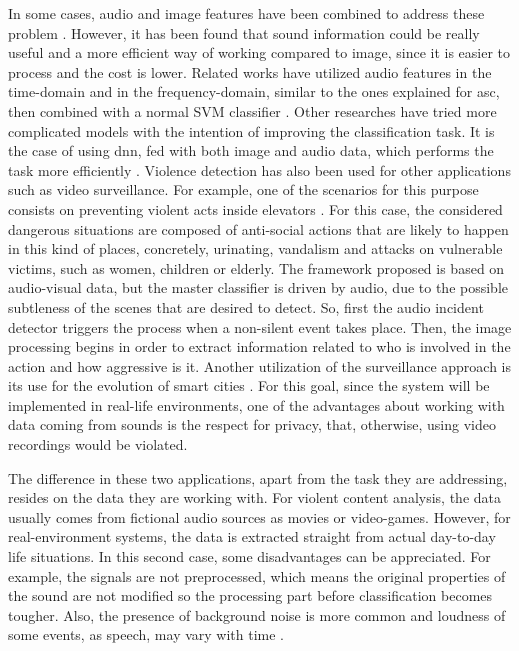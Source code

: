	In some cases, audio and image features have been combined to address these problem \cite{Giannakopoulos2010}. However, it has been found that sound information could be really useful and a more efficient way of working compared to image, since it is easier to process and the cost is lower. Related works have utilized audio features in the time-domain and in the frequency-domain, similar to the ones explained for \acrshort{asc}, then combined with a normal SVM classifier \cite{Giannakopoulos2006}. Other researches have tried more complicated models with the intention of improving the classification task. It is the case of using \acrshort{dnn}, fed with both image and audio data, which performs the task more efficiently \cite{Ali2018}. Violence detection has also been used for other applications such as video surveillance. For example, one of the scenarios for this purpose consists on preventing violent acts inside elevators \cite{Chua2014}. For this case, the considered dangerous situations are composed of anti-social actions that are likely to happen in this kind of places, concretely, urinating, vandalism and attacks on vulnerable victims, such as women, children or elderly. The framework proposed is based on audio-visual data, but the master classifier is driven by audio, due to the possible subtleness of the scenes that are desired to detect. So, first the audio incident detector triggers the process when a non-silent event takes place. Then, the image processing begins in order to extract information related to who is involved in the action and how aggressive is it. Another utilization of the surveillance approach is its use for the evolution of smart cities \cite{Garcia-Gomez2016}. For this goal, since the system will be implemented in real-life environments, one of the advantages about working with data coming from sounds is the respect for privacy, that, otherwise, using video recordings would be violated.
	
	The difference in these two applications, apart from the task they are addressing, resides on the data they are working with. For violent content analysis, the data usually comes from fictional audio sources as movies or video-games. However, for real-environment systems, the data is extracted straight from actual day-to-day life situations. In this second case, some disadvantages can be appreciated. For example, the signals are not preprocessed, which means the original properties of the sound are not modified so the processing part before classification becomes tougher. Also, the presence of background noise is more common and loudness of some events, as speech, may vary with time \cite{Bautista-Duran2017}. 

